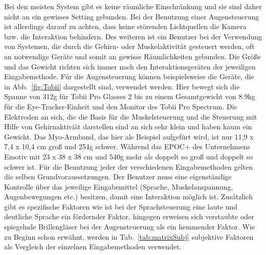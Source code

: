 \newline \newline \newline \newline \newline
Bei den meisten System gibt es keine räumliche Einschränkung und sie sind daher nicht an ein gewisses Setting gebunden. Bei der Benutzung einer Augensteuerung ist allerdings darauf zu achten, dass keine störenden Lichtquellen die Kamera bzw. die Interaktion behindern. Des weiteren ist ein Benutzer bei der Verwendung von Systemen, die durch die Gehirn- oder Muskelaktivität gesteuert werden, oft an notwendige Geräte und somit an gewisse Räumlichkeiten gebunden.
\newline \newline
Die Größe und das Gewicht richten sich immer nach den Interaktionsgeräten der jeweiligen Eingabemethode. Für die Augensteuerung können beispielsweise die Geräte, die in Abb.~\ref{fig:Tobii} dargestellt sind, verwendet werden. Hier bewegt sich die Spanne von 312g für Tobii Pro Glasses 2 bis zu einem Gesamtgewicht von 8.9kg für die Eye-Tracker-Einheit und den Monitor des Tobii Pro Spectrum. Die Elektroden an sich, die die Basis für die Muskelsteuerung und die Steuerung mit Hilfe von Gehirnaktiviät darstellen sind an sich sehr klein und haben kaum ein Gewicht. Das Myo-Armband, das hier als Beispiel aufgefürt wird, ist nur 11,9 x 7,4 x 10,4 cm groß und 254g schwer. Während das EPOC+ des Unternehmens Emotiv mit 23 x 38 x 38 cm und 540g mehr als doppelt so groß und doppelt so schwer ist.
\newline \newline
Für die Benutzung jeder der verschiedenen Eingabemethoden gelten die selben Grundvoraussetzungen. Der Benutzer muss eine eigenständige Kontrolle über das jeweilige Eingabemittel (Sprache, Muskelanspannung, Augenbewegungen etc.) besitzen, damit eine Interaktion möglich ist. Zusätzlich gibt es spezifische Faktoren wie \zB ist bei der Sprachsteuerung eine laute und deutliche Sprache ein fördernder Faktor, hingegen erweisen sich verstaubte oder spiegelnde Brillengläser bei der Augensteuerung als ein hemmender Faktor.
\newline \newline
Wie zu Beginn schon erwähnt, werden in Tab.~\ref{tab:matrixSubj} subjektive Faktoren als Vergleich der einzelnen Eingabemethoden verwendet.
\newline \newline

